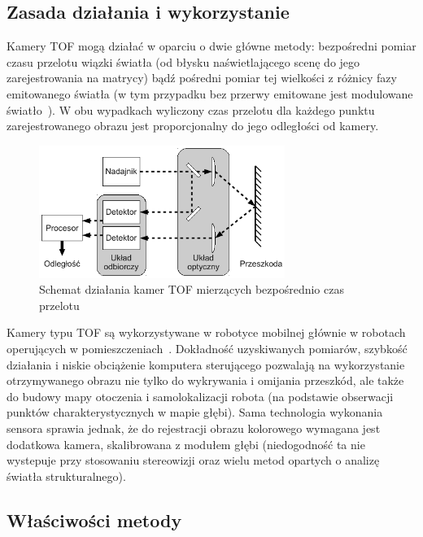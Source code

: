 \subsection{Zasada działania i wykorzystanie}

Kamery TOF mogą działać w oparciu o dwie główne metody: bezpośredni pomiar
czasu przelotu wiązki światła (od błysku naświetlającego scenę do jego
zarejestrowania na matrycy) bądź pośredni pomiar tej wielkości z różnicy fazy
emitowanego światła (w tym przypadku bez przerwy emitowane jest modulowane
światło~\cite{910448}). W obu wypadkach wyliczony czas przelotu dla każdego
punktu zarejestrowanego obrazu jest proporcjonalny do jego odległości od kamery.

\begin{figure}[h!]
\centering
\includegraphics[width=8cm]{../../Common/img/tof} 
\caption{Schemat działania kamer TOF mierzących bezpośrednio czas przelotu}
\label{fig:tof}
\end{figure}

Kamery typu TOF są wykorzystywane w robotyce mobilnej głównie w robotach
operujących w pomieszczeniach~\cite{Prusak:2008:PEM:1462089.1462102}. Dokładność
uzyskiwanych pomiarów, szybkość działania i niskie obciążenie komputera
sterującego pozwalają na wykorzystanie otrzymywanego obrazu nie tylko do
wykrywania i omijania przeszkód, ale także do budowy mapy otoczenia i
samolokalizacji robota (na podstawie obserwacji punktów charakterystycznych w
mapie głębi). Sama technologia wykonania sensora sprawia jednak, że do
rejestracji obrazu kolorowego wymagana jest dodatkowa kamera, skalibrowana z
modułem głębi (niedogodność ta nie wystepuje przy stosowaniu stereowizji oraz
wielu metod opartych o analizę światła strukturalnego).

\subsection{Właściwości metody}


